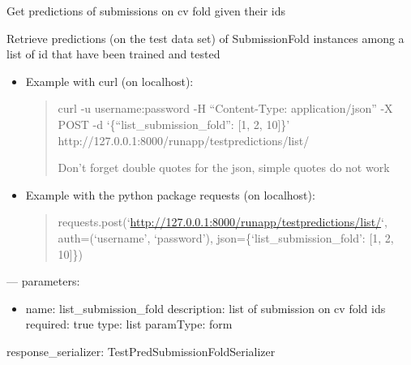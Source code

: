 \documentclass[letterpaper,10pt,english]{sphinxmanual}
\begin{document}
\begin{fulllineitems}
\label{modules/views:runapp.views.GetTestPredictionList}
Get predictions of submissions on cv fold given their ids

\begin{fulllineitems}
\label{modules/views:runapp.views.GetTestPredictionList.post}
Retrieve predictions (on the test data set) of SubmissionFold instances
among a list of id that have been trained and tested
\begin{itemize}
\item {} 
Example with curl (on localhost):
\begin{quote}

curl -u username:password -H ``Content-Type: application/json''            -X POST            -d `\{``list\_submission\_fold'': {[}1, 2, 10{]}\}'                http://127.0.0.1:8000/runapp/testpredictions/list/

Don't forget double quotes for the json, simple quotes do not work
\end{quote}

\item {} 
Example with the python package requests (on localhost):
\begin{quote}

requests.post(`\url{http://127.0.0.1:8000/runapp/testpredictions/list/}`,                          auth=(`username', `password'),                          json=\{`list\_submission\_fold': {[}1, 2, 10{]}\})
\end{quote}

\end{itemize}

---
parameters:
\begin{itemize}
\item {} 
name: list\_submission\_fold
description: list of submission on cv fold ids
required: true
type: list
paramType: form

\end{itemize}

response\_serializer: TestPredSubmissionFoldSerializer

\end{fulllineitems}


\end{fulllineitems}
\end{document}
